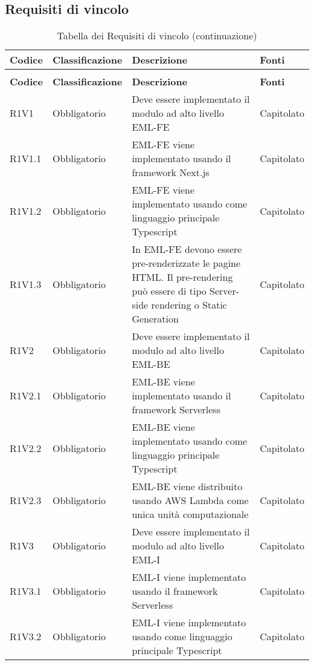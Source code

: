 \subsection{Requisiti di vincolo}

{


\centering
\renewcommand{\arraystretch}{2}
\begin{longtable}{C{2.5cm} C{2.8cm} C{6.7cm} C{2.5cm}}
\caption{Tabella dei Requisiti di vincolo}\\
\textbf{Codice} &
\textbf{Classificazione}&
\textbf{Descrizione}&
\textbf{Fonti}\\
\endfirsthead
{}
\caption*{Tabella dei Requisiti di vincolo (continuazione)}\\
\textbf{Codice} &
\textbf{Classificazione}&
\textbf{Descrizione}&
\textbf{Fonti}\\
\endhead


R1V1 & Obbligatorio & Deve essere implementato il modulo ad alto livello EML-FE & Capitolato \\
R1V1.1 & Obbligatorio & EML-FE viene implementato usando il framework Next.js & Capitolato \\
R1V1.2 & Obbligatorio & EML-FE viene implementato usando come linguaggio principale Typescript & Capitolato \\
R1V1.3 & Obbligatorio & In EML-FE devono essere pre-renderizzate le pagine HTML. Il pre-rendering può essere di tipo Server-side rendering o Static Generation & Capitolato \\


R1V2 & Obbligatorio & Deve essere implementato il modulo ad alto livello EML-BE & Capitolato \\
R1V2.1 & Obbligatorio & EML-BE viene implementato usando il framework Serverless & Capitolato \\
R1V2.2 & Obbligatorio & EML-BE viene implementato usando come linguaggio principale Typescript & Capitolato \\
R1V2.3 & Obbligatorio & EML-BE viene distribuito usando AWS Lambda come unica unità computazionale & Capitolato \\


R1V3 & Obbligatorio & Deve essere implementato il modulo ad alto livello EML-I & Capitolato \\
R1V3.1 & Obbligatorio & EML-I viene implementato usando il framework Serverless & Capitolato \\
R1V3.2 & Obbligatorio & EML-I viene implementato usando come linguaggio principale Typescript & Capitolato \\


\end{longtable}}
